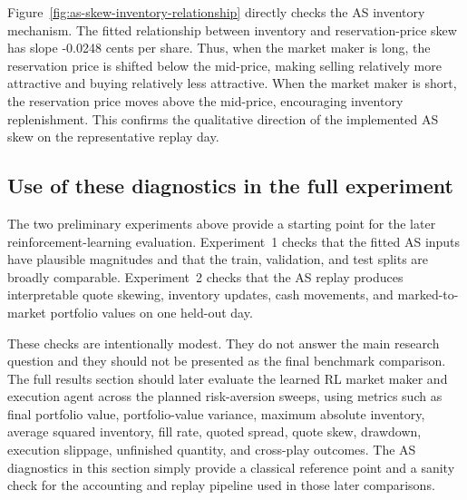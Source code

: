 \documentclass[oneside]{uva-inf-bachelor-thesis}
\begin{document}
Figure~\ref{fig:as-skew-inventory-relationship} directly checks the AS inventory mechanism. The fitted relationship between inventory and reservation-price skew has slope -0.0248 cents per share. Thus, when the market maker is long, the reservation price is shifted below the mid-price, making selling relatively more attractive and buying relatively less attractive. When the market maker is short, the reservation price moves above the mid-price, encouraging inventory replenishment. This confirms the qualitative direction of the implemented AS skew on the representative replay day.

\subsection{Use of these diagnostics in the full experiment}
\label{subsec:as-rl-implications}

The two preliminary experiments above provide a starting point for the later reinforcement-learning evaluation. Experiment~1 checks that the fitted AS inputs have plausible magnitudes and that the train, validation, and test splits are broadly comparable. Experiment~2 checks that the AS replay produces interpretable quote skewing, inventory updates, cash movements, and marked-to-market portfolio values on one held-out day.

These checks are intentionally modest. They do not answer the main research question and they should not be presented as the final benchmark comparison. The full results section should later evaluate the learned RL market maker and execution agent across the planned risk-aversion sweeps, using metrics such as final portfolio value, portfolio-value variance, maximum absolute inventory, average squared inventory, fill rate, quoted spread, quote skew, drawdown, execution slippage, unfinished quantity, and cross-play outcomes. The AS diagnostics in this section simply provide a classical reference point and a sanity check for the accounting and replay pipeline used in those later comparisons.





\end{document}
